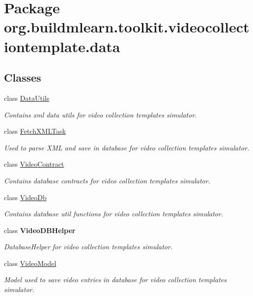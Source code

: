 \hypertarget{namespaceorg_1_1buildmlearn_1_1toolkit_1_1videocollectiontemplate_1_1data}{}\section{Package org.\+buildmlearn.\+toolkit.\+videocollectiontemplate.\+data}
\label{namespaceorg_1_1buildmlearn_1_1toolkit_1_1videocollectiontemplate_1_1data}
\subsection*{Classes}
\begin{DoxyCompactItemize}
\item 
class \hyperlink{classorg_1_1buildmlearn_1_1toolkit_1_1videocollectiontemplate_1_1data_1_1DataUtils}{Data\+Utils}
\begin{DoxyCompactList}\small\item\em Contains xml data utils for video collection template\textquotesingle{}s simulator. \end{DoxyCompactList}\item 
class \hyperlink{classorg_1_1buildmlearn_1_1toolkit_1_1videocollectiontemplate_1_1data_1_1FetchXMLTask}{Fetch\+X\+M\+L\+Task}
\begin{DoxyCompactList}\small\item\em Used to parse X\+ML and save in database for video collection template\textquotesingle{}s simulator. \end{DoxyCompactList}\item 
class \hyperlink{classorg_1_1buildmlearn_1_1toolkit_1_1videocollectiontemplate_1_1data_1_1VideoContract}{Video\+Contract}
\begin{DoxyCompactList}\small\item\em Contains database contracts for video collection template\textquotesingle{}s simulator. \end{DoxyCompactList}\item 
class \hyperlink{classorg_1_1buildmlearn_1_1toolkit_1_1videocollectiontemplate_1_1data_1_1VideoDb}{Video\+Db}
\begin{DoxyCompactList}\small\item\em Contains database util functions for video collection template\textquotesingle{}s simulator. \end{DoxyCompactList}\item 
class {\bfseries Video\+D\+B\+Helper}
\begin{DoxyCompactList}\small\item\em Database\+Helper for video collection template\textquotesingle{}s simulator. \end{DoxyCompactList}\item 
class \hyperlink{classorg_1_1buildmlearn_1_1toolkit_1_1videocollectiontemplate_1_1data_1_1VideoModel}{Video\+Model}
\begin{DoxyCompactList}\small\item\em Model used to save video entries in database for video collection template\textquotesingle{}s simulator. \end{DoxyCompactList}\end{DoxyCompactItemize}

